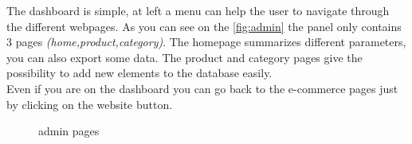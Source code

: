 \documentclass{article}
\begin{document}
The dashboard is simple, at left a menu can help the user to navigate through the different webpages. As you can see on the \autoref{fig:admin} the panel only contains 3 pages \textit{(home,product,category)}. The homepage summarizes different parameters, you can also export some data. The product and category pages give the possibility to add new elements to the database easily. \\

Even if you are on the dashboard you can go back to the e-commerce pages just by clicking on the website button.

\begin{figure}[h!]
    \centering
    \qquad
    \caption{admin pages}%
    \label{fig:admin}%
\end{figure}
\end{document}
